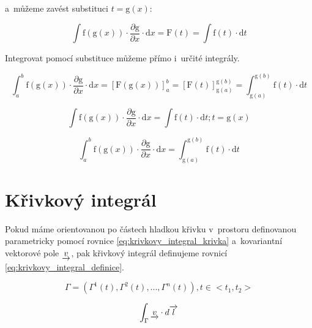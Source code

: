 a~můžeme zavést substituci \(t = \mathrm{g}(x)\): 

\begin{equation}
\int \mathrm{f}(\mathrm{g}(x)) \cdot \frac{\partial \mathrm{g}}{\partial x} \cdot \mathrm{d}x = \mathrm{F}(t) = \int \mathrm{f}(t) \cdot \mathrm{d}t
\end{equation}

Integrovat pomocí substituce můžeme přímo i~určité integrály.

\begin{equation}
\int_a^b \mathrm{f}(\mathrm{g}(x)) \cdot \frac{\partial \mathrm{g}}{\partial x} \cdot \mathrm{d}x = [\mathrm{F}(\mathrm{g}(x))]_a^b = [\mathrm{F}(t)]_{\mathrm{g}(a)}^{\mathrm{g}(b)} = \int_{\mathrm{g}(a)}^{\mathrm{g}(b)} \mathrm{f}(t) \cdot \mathrm{d}t
\end{equation}

\begin{fact}
\begin{equation}
\int \mathrm{f}(\mathrm{g}(x)) \cdot \frac{\partial \mathrm{g}}{\partial x} \cdot \mathrm{d}x = \int \mathrm{f}(t) \cdot \mathrm{d}t; t = \mathrm{g}(x)
\end{equation}

\begin{equation}
\int_a^b \mathrm{f}(\mathrm{g}(x)) \cdot \frac{\partial \mathrm{g}}{\partial x} \cdot \mathrm{d}x = \int_{\mathrm{g}(a)}^{\mathrm{g}(b)} \mathrm{f}(t) \cdot \mathrm{d}t
\end{equation}

\end{fact}

\section{Křivkový integrál}

Pokud máme orientovanou po částech hladkou křivku v~prostoru definovanou parametricky pomocí rovnice \eqref{eq:krivkovy_integral_krivka} a~kovariantní vektorové pole \(\underrightarrow{v}\), pak křivkový integrál definujeme rovnicí \eqref{eq:krivkovy_integral_definice}.

\begin{equation}
\label{eq:krivkovy_integral_krivka}
\Gamma = (\Gamma^1(t), \Gamma^2(t), ..., \Gamma^n(t)), t \in <t_1, t_2>
\end{equation}

\begin{equation}
\label{eq:krivkovy_integral_definice}
\begin{split}
\int_\Gamma \underrightarrow{v} \cdot d\overrightarrow{l}
\end{split}
\end{equation}

